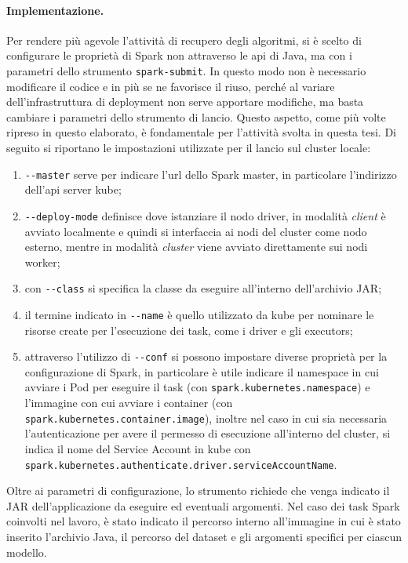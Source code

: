 \documentclass[12pt,a4paper,fleqn,titlepage]{report}
\begin{document}
        \paragraph{Implementazione.}
        Per rendere più agevole l'attività di recupero degli algoritmi, si è scelto di configurare le proprietà di Spark non attraverso le \gls{api} di Java, ma con i parametri dello strumento \lstinline{spark-submit}. In questo modo non è necessario modificare il codice e in più se ne favorisce il riuso, perché al variare dell'infrastruttura di deployment non serve apportare modifiche, ma basta cambiare i parametri dello strumento di lancio. Questo aspetto, come più volte ripreso in questo elaborato, è fondamentale per l'attività svolta in questa tesi. Di seguito si riportano le impostazioni utilizzate per il lancio sul \gls{cluster} locale:
        \begin{enumerate}
            \item \lstinline{--master} serve per indicare l'\gls{url} dello Spark master, in particolare l'indirizzo dell'\gls{api} server \gls{kube};
            \item \lstinline{--deploy-mode} definisce dove istanziare il nodo driver, in modalità \emph{client} è avviato localmente e quindi si interfaccia ai nodi del \gls{cluster} come nodo esterno, mentre in modalità \emph{cluster} viene avviato direttamente sui nodi worker;
            \item con \lstinline{--class} si specifica la classe da eseguire all'interno dell'archivio JAR;
            \item il termine indicato in \lstinline{--name} è quello utilizzato da \gls{kube} per nominare le risorse create per l'esecuzione dei task, come i driver e gli executors;
            \item attraverso l'utilizzo di \lstinline{--conf} si possono impostare diverse proprietà per la configurazione di Spark, in particolare è utile indicare il namespace in cui avviare i Pod per eseguire il task (con \lstinline{spark.kubernetes.namespace}) e l'immagine con cui avviare i \gls{container} (con \lstinline{spark.kubernetes.container.image}), inoltre nel caso in cui sia necessaria l'autenticazione per avere il permesso di esecuzione all'interno del \gls{cluster}, si indica il nome del Service Account in \gls{kube} con \lstinline{spark.kubernetes.authenticate.driver.serviceAccountName}.
        \end{enumerate}
        Oltre ai parametri di configurazione, lo strumento richiede che venga indicato il JAR dell'applicazione da eseguire ed eventuali argomenti. Nel caso dei task Spark coinvolti nel lavoro, è stato indicato il percorso interno all'immagine in cui è stato inserito l'archivio Java, il percorso del dataset e gli argomenti specifici per ciascun modello.
\end{document}
